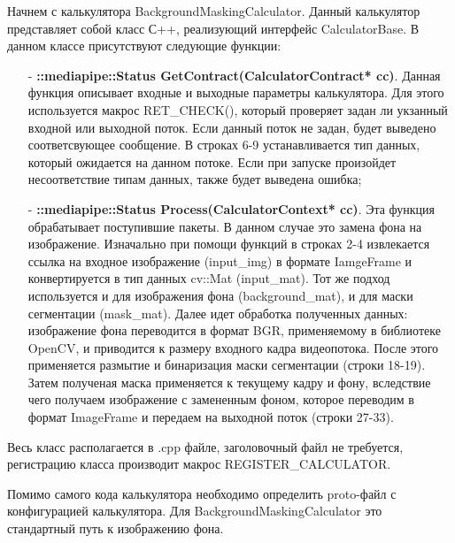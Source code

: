 \documentclass[a4paper,14pt]{extreport}
\begin{document}
        Начнем с калькулятора BackgroundMaskingCalculator. Данный калькулятор представляет собой класс С++, реализующий интерфейс CalculatorBase. В данном классе присутствуют следующие функции:
        \begin{itemize}
            \item[-] \textbf{::mediapipe::Status GetContract(CalculatorContract* cc)}.  Данная функция описывает входные и выходные параметры калькулятора. Для этого используется макрос RET\_CHECK(), который проверяет задан ли укзанный входной или выходной поток. Если данный поток не задан, будет выведено соответсвующее сообщение. В строках 6-9 устанавливается тип данных, который ожидается на данном потоке. Если при запуске произойдет несоответствие типам данных, также будет выведена ошибка;
            
            \item[-] \textbf{::mediapipe::Status Process(CalculatorContext* cc)}.  Эта функция обрабатывает поступившие пакеты. В данном случае это замена фона на изображение. Изначально при помощи функций в строках 2-4 извлекается ссылка на входное изображение (input\_img) в формате IamgeFrame и конвертируется в тип данных cv::Mat (input\_mat). Тот же подход используется и для изображения фона (background\_mat), и для маски сегментации (mask\_mat). Далее идет обработка полученных данных: изображение фона переводится в формат BGR, применяемому в библиотеке OpenCV, и приводится к размеру входного кадра видеопотока. После этого применяется размытие и бинаризация маски сегментации (строки 18-19). Затем полученая маска применяется к текущему кадру и фону, вследствие чего получаем изображение с замененным фоном, которое переводим в формат ImageFrame и передаем на выходной поток (строки 27-33).
        \end{itemize}

        Весь класс располагается в .cpp файле, заголовочный файл не требуется, регистрацию класса производит макрос REGISTER\_CALCULATOR.

        Помимо самого кода калькулятора необходимо определить proto-файл с конфигурацией калькулятора. Для BackgroundMaskingCalculator это стандартный путь к изображению фона.
        
\end{document}

